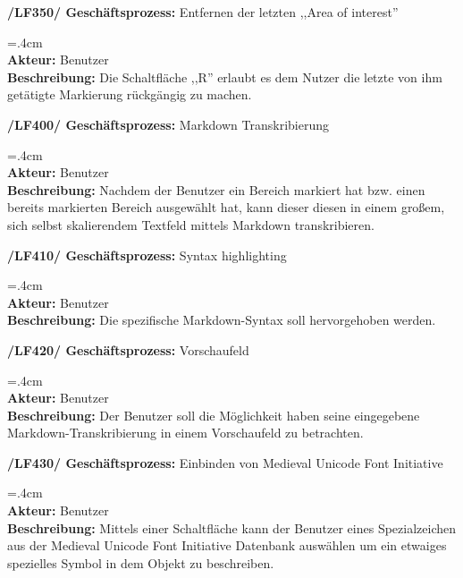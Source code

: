 \documentclass{article}
\newenvironment{funcD}{\vspace{-.6cm}\\\par\begingroup\leftskip=.4cm\noindent\\}{\\\par\endgroup\noindent}
\begin{document}
\textbf{/LF350/ Geschäftsprozess:} Entfernen der letzten ,,Area of interest''
\begin{funcD}
    \textbf{Akteur:} Benutzer\vspace{.1cm}\\
    \textbf{Beschreibung:} Die Schaltfläche ,,R'' erlaubt es dem Nutzer die letzte von ihm getätigte Markierung rückgängig zu machen. 
\end{funcD}
\textbf{/LF400/ Geschäftsprozess:} Markdown Transkribierung
\begin{funcD}
    \textbf{Akteur:} Benutzer\vspace{.1cm}\\
    \textbf{Beschreibung:} Nachdem der Benutzer ein Bereich markiert hat bzw. einen bereits markierten Bereich ausgewählt hat, kann dieser diesen in einem großem, sich selbst skalierendem Textfeld mittels Markdown transkribieren. 
\end{funcD}
\textbf{/LF410/ Geschäftsprozess:} Syntax highlighting
\begin{funcD}
    \textbf{Akteur:} Benutzer\vspace{.1cm}\\
    \textbf{Beschreibung:} Die spezifische Markdown-Syntax soll hervorgehoben werden. 
\end{funcD}
\textbf{/LF420/ Geschäftsprozess:} Vorschaufeld
\begin{funcD}
    \textbf{Akteur:} Benutzer\vspace{.1cm}\\
    \textbf{Beschreibung:} Der Benutzer soll die Möglichkeit haben seine eingegebene Markdown-Transkribierung in einem Vorschaufeld zu betrachten.
\end{funcD}
\textbf{/LF430/ Geschäftsprozess:} Einbinden von Medieval Unicode Font Initiative
\begin{funcD}
    \textbf{Akteur:} Benutzer\vspace{.1cm}\\
    \textbf{Beschreibung:} Mittels einer Schaltfläche kann der Benutzer eines Spezialzeichen aus der Medieval Unicode Font Initiative Datenbank auswählen um ein etwaiges spezielles Symbol in dem Objekt zu beschreiben. 
\end{funcD}
\end{document}
